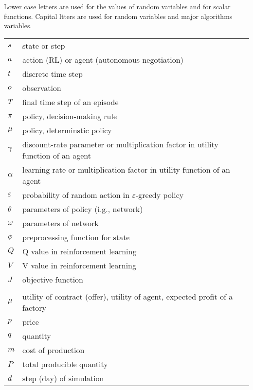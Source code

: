 Lower case letters are used for the values of random variables and for scalar functions. Capital ltters are used for random variables and major algorithms variables.

\begin{tabular}{p{1.5cm} p{12cm}}
$s$ & state or step\\
$a$ & action (RL) or agent (autonomous negotiation)\\
$t$ & discrete time step \\
$o$ & observation \\
$T$ & final time step of an episode \\
$\pi$ & policy, decision-making rule \\
$\mu$ & policy, determinstic policy \\
$\gamma$ & discount-rate parameter or multiplication factor in utility function of an agent\\
$\alpha$ & learning rate or multiplication factor in utility function of an agent\\
$\varepsilon$ & probability of random action in $\varepsilon$-greedy policy \\
$\theta$ & parameters of policy (i.g., network) \\
$\omega$ & parameters of network \\
$\phi$ & preprocessing function for state \\
$Q$ & Q value in reinforcement learning \\
$V$ & V value in reinforcement learning \\
$J$ & objective function \\
\\
$\mu$ & utility of contract (offer), utility of agent, expected profit of a factory \\
$p$ & price \\
$q$ & quantity \\
$m$ & cost of production \\
$P$ & total producible quantity \\
$d$ & step (day) of simulation \\
\end{tabular}


